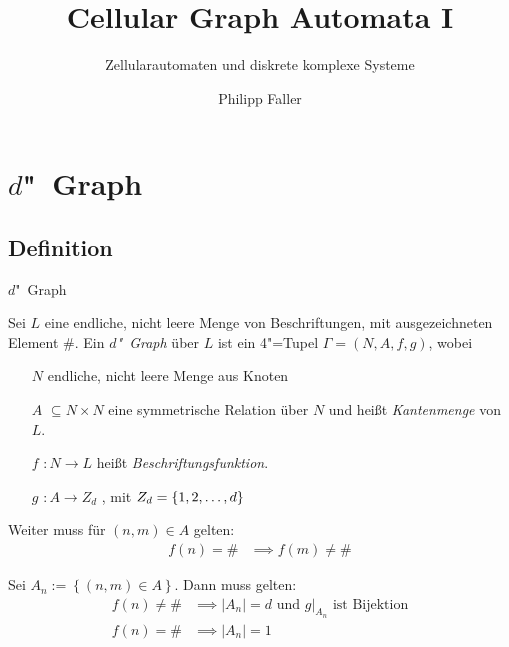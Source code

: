 \documentclass[18pt]{beamer}
\title[Cellular Graph Automata I]{Cellular Graph Automata I}
\subtitle{Zellularautomaten und diskrete komplexe Systeme}
\author{Philipp Faller}
\institute{Worsch}
\newcommand{\defWord}[1]{\emph{#1}}
\begin{document}

\begin{frame}
\titlepage
\end{frame}


\section{$d$"~Graph}
\subsection{Definition}
\begin{frame}{$d$"~Graph}
	\begin{definition}[$d$"~Graph]
		Sei $L$ eine endliche, nicht leere Menge von Beschriftungen, mit ausgezeichneten Element $\#$. 
		Ein \defWord{$d$"~Graph} über $L$ ist ein 4"=Tupel $\Gamma = \left(N, A, f, g\right)$, wobei
		\begin{itemize}
			\item[$N$] endliche, nicht leere Menge aus Knoten 
			\item[$A$] $\subseteq N \times N$ eine symmetrische Relation über $N$ und heißt \defWord{Kantenmenge} von $L$.
			\item[$f$] $: N \rightarrow L$  heißt \defWord{Beschriftungsfunktion}.
			\item[$g$] $: A \rightarrow Z_d$ , mit $Z_d = \left \{1, 2,\text{\dots}, d \right \}$ 			
		\end{itemize}
	\end{definition}
\end{frame}

\begin{frame}
	\begin{definition}[$d$"~Graph]
		Weiter muss für $\left(n, m\right) \in A$ gelten:
		\begin{align*}
			f(n) = \# &\implies f(m) \neq \#
		\end{align*}
		
		Sei $A_n := \left \{\left(n, m\right) \in A\right \}$. Dann muss gelten:
		\begin{align*}
			f(n) \neq \# &\implies  \left|A_n\right| = d \text{ und } g \vert_{A_n} \text{ ist Bijektion} \\
			f(n) = \# &\implies\left|A_n\right| = 1
		\end{align*}
		
	\end{definition}
\end{frame}
\end{document}
